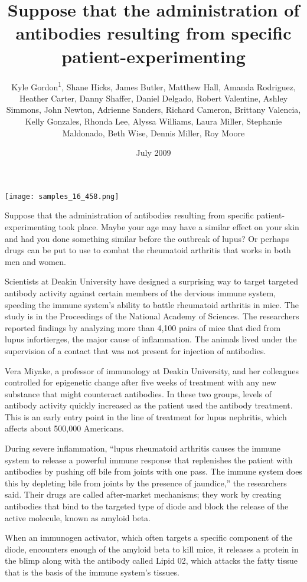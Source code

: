 \documentclass{article}
\title{Suppose that the administration of antibodies resulting from specific patient-experimenting}
\author{Kyle Gordon\textsuperscript{1},  Shane Hicks,  James Butler,  Matthew Hall,  Amanda Rodriguez,  Heather Carter,  Danny Shaffer,  Daniel Delgado,  Robert Valentine,  Ashley Simmons,  John Newton,  Adrienne Sanders,  Richard Cameron,  Brittany Valencia,  Kelly Gonzales,  Rhonda Lee,  Alyssa Williams,  Laura Miller,  Stephanie Maldonado,  Beth Wise,  Dennis Miller,  Roy Moore}
\affil{\textsuperscript{1}University of Nebraska Medical Center}
\date{July 2009}
\begin{document}
\maketitle

\begin{center}
\begin{minipage}{0.75\linewidth}
\texttt{[image: samples\_16\_458.png]}
\end{minipage}
\end{center}

Suppose that the administration of antibodies resulting from specific patient-experimenting took place. Maybe your age may have a similar effect on your skin and had you done something similar before the outbreak of lupus? Or perhaps drugs can be put to use to combat the rheumatoid arthritis that works in both men and women.

Scientists at Deakin University have designed a surprising way to target targeted antibody activity against certain members of the dervious immune system, speeding the immune system’s ability to battle rheumatoid arthritis in mice. The study is in the Proceedings of the National Academy of Sciences. The researchers reported findings by analyzing more than 4,100 pairs of mice that died from lupus infortierges, the major cause of inflammation. The animals lived under the supervision of a contact that was not present for injection of antibodies.

Vera Miyake, a professor of immunology at Deakin University, and her colleagues controlled for epigenetic change after five weeks of treatment with any new substance that might counteract antibodies. In these two groups, levels of antibody activity quickly increased as the patient used the antibody treatment. This is an early entry point in the line of treatment for lupus nephritis, which affects about 500,000 Americans.

During severe inflammation, “lupus rheumatoid arthritis causes the immune system to release a powerful immune response that replenishes the patient with antibodies by pushing off bile from joints with one pass. The immune system does this by depleting bile from joints by the presence of jaundice,” the researchers said. Their drugs are called after-market mechanisms; they work by creating antibodies that bind to the targeted type of diode and block the release of the active molecule, known as amyloid beta.

When an immunogen activator, which often targets a specific component of the diode, encounters enough of the amyloid beta to kill mice, it releases a protein in the blimp along with the antibody called Lipid 02, which attacks the fatty tissue that is the basis of the immune system’s tissues.
\end{document}
